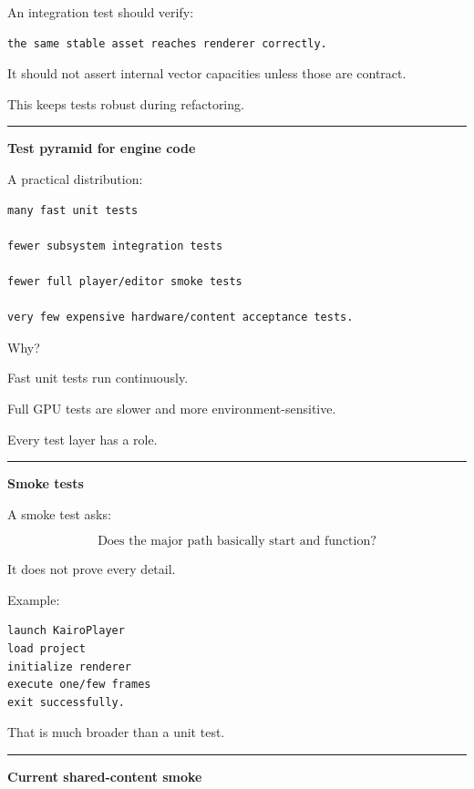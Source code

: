 An integration test should verify:

\begin{verbatim}
the same stable asset reaches renderer correctly.
\end{verbatim}

It should not assert internal vector capacities unless those are contract.

This keeps tests robust during refactoring.

\begin{center}\rule{0.5\linewidth}{0.5pt}\end{center}

\textbf{Test pyramid for engine code}

A practical distribution:

\begin{verbatim}
many fast unit tests

fewer subsystem integration tests

fewer full player/editor smoke tests

very few expensive hardware/content acceptance tests.
\end{verbatim}

Why?

Fast unit tests run continuously.

Full GPU tests are slower and more environment-sensitive.

Every test layer has a role.

\begin{center}\rule{0.5\linewidth}{0.5pt}\end{center}

\textbf{Smoke tests}

A smoke test asks:

\[
\boxed{
\text{Does the major path basically start and function?}
}
\]

It does not prove every detail.

Example:

\begin{verbatim}
launch KairoPlayer
load project
initialize renderer
execute one/few frames
exit successfully.
\end{verbatim}

That is much broader than a unit test.

\begin{center}\rule{0.5\linewidth}{0.5pt}\end{center}

\textbf{Current shared-content smoke}

